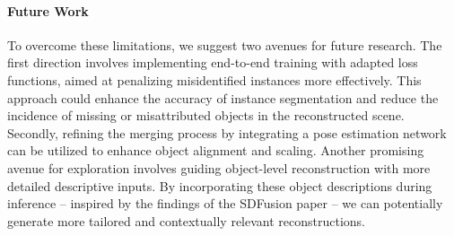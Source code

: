 \paragraph{Future Work}
\label{sec:future}
To overcome these limitations, we suggest two avenues for future research.
The first direction involves implementing end-to-end training with adapted loss functions, aimed at penalizing misidentified instances more effectively.
This approach could enhance the accuracy of instance segmentation and reduce the incidence of missing or misattributed objects in the reconstructed scene.
Secondly, refining the merging process by integrating a pose estimation network can be utilized to enhance object alignment and scaling.
Another promising avenue for exploration involves guiding object-level reconstruction with more detailed descriptive inputs.
By incorporating these object descriptions during inference -- inspired by the findings of the SDFusion paper -- we can potentially generate more tailored and contextually relevant reconstructions.
